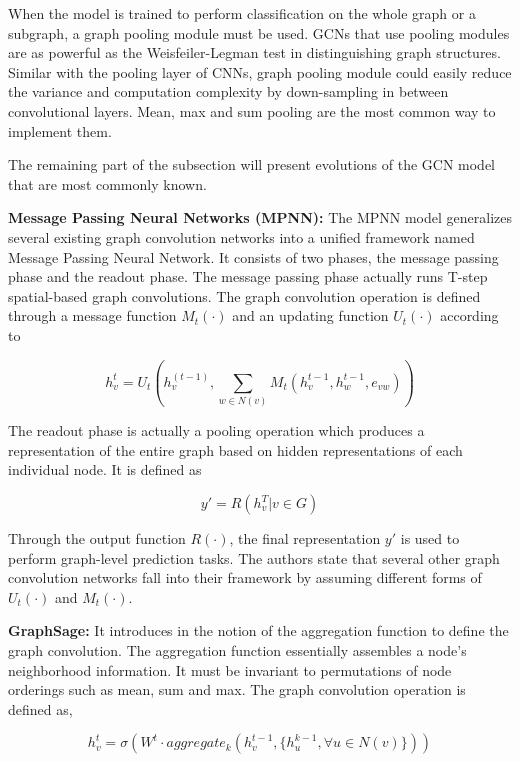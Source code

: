 
When the model is trained to perform classification on the whole graph or a subgraph, a graph pooling module must be used. GCNs that use pooling modules are as powerful as the Weisfeiler-Legman test in distinguishing graph structures. Similar with the pooling layer of CNNs, graph pooling module could easily reduce the variance and computation complexity by down-sampling in between convolutional layers. Mean, max and sum pooling are the most common way to implement them.


The remaining part of the subsection will present evolutions of the GCN model that are most commonly known.

\textbf{Message Passing Neural Networks (MPNN):} The MPNN model generalizes several existing graph convolution networks into a unified framework named Message Passing Neural Network. It consists of two phases, the message passing phase and the readout phase. The message passing phase actually runs T-step spatial-based graph convolutions. The graph convolution operation is defined through a message function $M_t(\cdot)$ and an updating function $U_t(\cdot)$ according to 

$$ h_v^t = U_t(h_v^{(t-1)}, \sum_{w \in N(v)} M_t(h_v^{t-1}, h_w^{t-1}, e_{vw}))$$

The readout phase is actually a pooling operation which produces a representation of the entire graph based on hidden representations of each individual node. It is defined as 

$$ y' = R(h_v^T|v \in G) $$

Through the output function $R(\cdot)$, the final representation $y'$ is used to perform graph-level prediction tasks. The authors \cite{mpnn} state that several other graph convolution networks fall into their framework by assuming different forms of $U_t(\cdot)$ and $M_t(·)$.


\textbf{GraphSage:} It introduces in \cite{graphsage} the notion of the aggregation function to define the graph convolution. The aggregation function essentially assembles a node's neighborhood information. It must be invariant to permutations of node orderings such as mean, sum and max. The graph convolution operation is defined as, 

$$ h_v^t = \sigma(W^t \cdot aggregate_k(h_v^{t-1}, \{h_u^{k-1}, \forall u \in N(v)\}))$$

